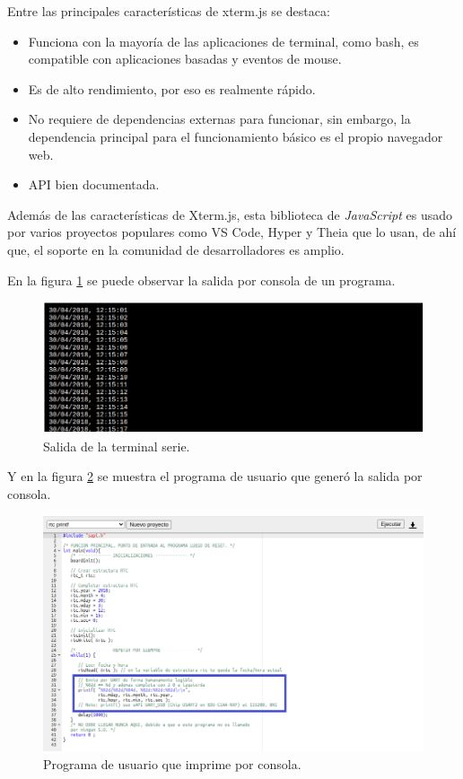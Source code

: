 Entre las principales características de xterm.js se destaca:

\begin{itemize}
	\item Funciona con la mayoría de las aplicaciones de terminal, como bash, es compatible con aplicaciones basadas y eventos de mouse.
	\item Es de alto rendimiento, por eso es realmente rápido.
	\item No requiere de dependencias externas para funcionar, sin embargo, la dependencia principal para el funcionamiento básico es el propio navegador web.
	\item API bien documentada.
\end{itemize}


Además de las características de Xterm.js, esta biblioteca de \textit{JavaScript} es usado por varios proyectos populares como VS Code, Hyper y Theia que lo usan, de ahí que, el soporte en la comunidad de desarrolladores es amplio.

En la figura \ref{fig:Terminal2} se puede observar la salida por consola de un programa.

\begin{figure}[ht]
	\centering
	\includegraphics[scale=.60]{./Figures/Terminal2.png}
	\caption{Salida de la terminal serie.}
	\label{fig:Terminal2}
\end{figure}

Y en la figura \ref{fig:Terminal1} se muestra el programa de usuario que generó la salida por consola.

\begin{figure}[ht]
	\centering
	\includegraphics[scale=.41]{./Figures/Terminal1.png}
	\caption{Programa de usuario que imprime por consola.}
	\label{fig:Terminal1}
\end{figure}
 



